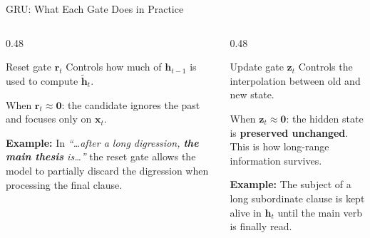 \documentclass[aspectratio=169]{beamer}
\begin{document}
\begin{frame}{GRU: What Each Gate Does in Practice}
\begin{columns}[T]
\begin{column}{0.48\textwidth}
\begin{block}{Reset gate $\bm{r}_t$}
Controls how much of $\bm{h}_{t-1}$ is used to compute $\tilde{\bm{h}}_t$.

\smallskip
When $\bm{r}_t \approx \bm{0}$: the candidate ignores the past and focuses only on $\bm{x}_t$.

\smallskip
\textbf{Example:} In \emph{``\ldots after a long digression, \textbf{the main thesis} is\ldots''}
the reset gate allows the model to partially discard the digression when processing the final clause.
\end{block}
\end{column}
\begin{column}{0.48\textwidth}
\begin{block}{Update gate $\bm{z}_t$}
Controls the interpolation between old and new state.

\smallskip
When $\bm{z}_t \approx \bm{0}$: the hidden state is \textbf{preserved unchanged}.
This is how long-range information survives.

\smallskip
\textbf{Example:} The subject of a long subordinate clause is kept alive in $\bm{h}_t$
until the main verb is finally read.
\end{block}
\end{column}
\end{columns}

\end{frame}
%
\end{document}
